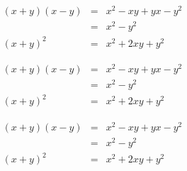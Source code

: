 $\begin{array}{ccc} (x+y)(x-y) & = & x^2-xy + yx-y^2 \\ & = & x^2-y^2 \\ (x+y)^2 & = & x^2 + 2xy + y^2 \end{array}$

$\begin{array}{lcr} (x+y)(x-y) & = & x^2-xy + yx-y^2 \\ & = & x^2-y^2 \\ (x+y)^2 & = & x^2 + 2xy + y^2 \end{array}$

$\begin{array}{rcl} (x+y)(x-y) & = & x^2-xy + yx-y^2 \\ & = & x^2-y^2 \\ (x+y)^2 & = & x^2 + 2xy + y^2 \end{array}$

